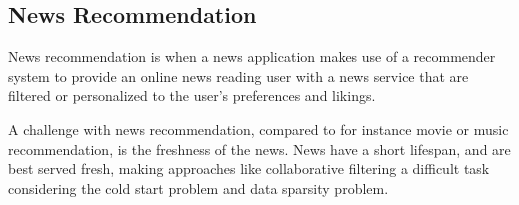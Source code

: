 \subsection{News Recommendation}
News recommendation is when a news application makes use of a recommender system to provide an online news reading user with a news service that are filtered or personalized to the user's preferences and likings.

A challenge with news recommendation, compared to for instance movie or music recommendation, is the freshness of the news. News have a short lifespan, and are best served fresh, making approaches like collaborative filtering a difficult task considering the cold start problem and data sparsity problem.




